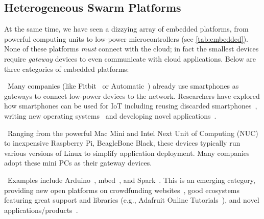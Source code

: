 \subsection{Heterogeneous Swarm Platforms}
\label{sec:swarm-platforms}

At the same time, we have seen a dizzying array of embedded platforms, from
powerful computing units to low-power microcontrollers (see
\autoref{tab:embedded}). None of these platforms \emph{must} connect with the
cloud; in fact the smallest devices require \emph{gateway} devices to even
communicate with cloud applications. Below are three categories of embedded
platforms:

~Many companies (like Fitbit~\cite{fitbit} or
Automatic~\cite{automatic}) already use smartphones as gateways to connect
low-power devices to the network.  Researchers have explored how smartphones can
be used for IoT including reusing discarded smartphones~\cite{challen2014mote},
writing new operating systems~\cite{janos} and developing novel
applications~\cite{hong2014smartphone}.

~Ranging from the powerful Mac Mini and Intel Next Unit of
Computing (NUC) to inexpensive Raspberry Pi, BeagleBone Black, these devices
typically run various versions of Linux to simplify application deployment.
Many companies~\cite{ninja, smartthings, wink} adopt these mini PCs as their
gateway devices.

~Examples include Arduino~\cite{arduino},
mbed~\cite{mbed}, and Spark~\cite{spark}. This is an emerging category,
providing new open platforms on crowdfunding websites~\cite{kickstarter}, good
ecosystems featuring great support and libraries (e.g., Adafruit Online
Tutorials~\cite{adafruit}), and novel applications/products~\cite{iotlist}.


